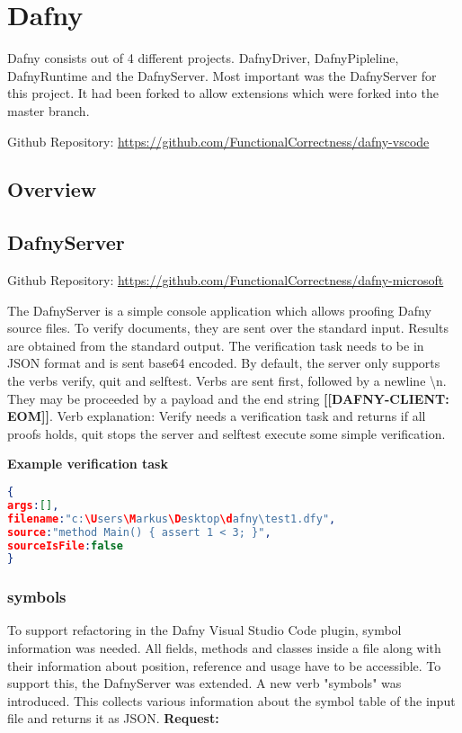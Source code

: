 \section{Dafny}
Dafny consists out of 4 different projects. DafnyDriver, DafnyPipleline, DafnyRuntime and the DafnyServer. Most important was the DafnyServer for this project. It had been forked to allow extensions which were forked into the master branch. 

Github Repository: \href{https://github.com/FunctionalCorrectness/dafny-vscode}{https://github.com/FunctionalCorrectness/dafny-vscode}

\subsection{Overview}



\subsection{DafnyServer}
Github Repository: \href{https://github.com/FunctionalCorrectness/dafny-microsoft}{https://github.com/FunctionalCorrectness/dafny-microsoft}

The DafnyServer is a simple console application which allows proofing Dafny source files. To verify documents, they are sent over the standard input. Results are obtained from the standard output. The verification task needs to be in JSON format  and is sent base64 encoded. By default, the server only supports the verbs verify, quit and selftest. Verbs are sent first, followed by a newline \textbackslash{n}. They may be proceeded by a payload and the end string \textbf{[[DAFNY-CLIENT: EOM]]}. \newline 
Verb explanation: Verify needs a verification task and returns if all proofs holds, quit stops the server and selftest execute some simple verification. \newline

\textbf{Example verification task}
\begin{lstlisting}[language=json,firstnumber=1]
{
args:[],
filename:"c:\Users\Markus\Desktop\dafny\test1.dfy",
source:"method Main() {	assert 1 < 3; }",
sourceIsFile:false
}

\end{lstlisting}

\subsubsection{symbols}
To support refactoring in the Dafny Visual Studio Code plugin, symbol information was needed. All fields, methods and classes inside a file along with their information about position, reference and usage have to be accessible. To support this, the DafnyServer was extended. A new verb "symbols" was introduced. This collects various information about the symbol table of the input file and returns it as JSON. 
\newline\newline
\textbf{Request: }

